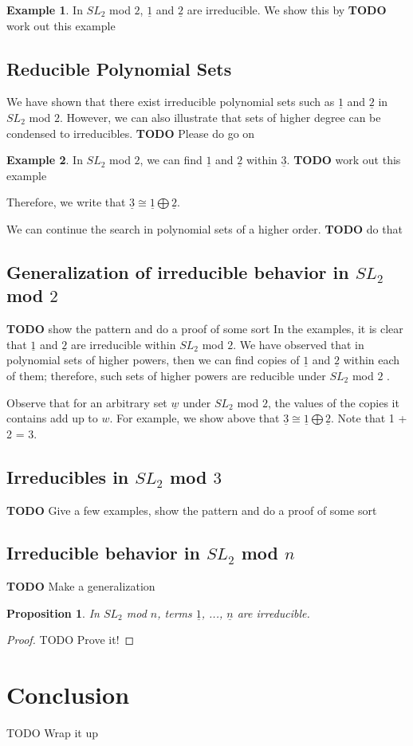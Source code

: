 \documentclass[a4paper,draft]{amsproc}
\theoremstyle{plain}
\newtheorem{prop}{Proposition}[section]
\theoremstyle{definition}
\newtheorem{exm}{Example}[section]
\theoremstyle{remark}
\numberwithin{equation}{section}
\begin{document}
\begin{exm}
In  $SL_{2}$ mod $2$, $\underline{1}$ and $\underline{2}$ are irreducible. We show this by
\textbf{TODO} work out this example
\end{exm}

\subsection{Reducible Polynomial Sets}
We have shown that there exist irreducible polynomial sets such as $\underline{1}$ and $\underline{2}$ in  $SL_{2}$ mod $2$. However, we can also illustrate that sets of higher degree can be condensed to irreducibles. 
\textbf{TODO} Please do go on
\begin{exm}
In  $SL_{2}$ mod $2$, we can find $\underline{1}$ and $\underline{2}$ within $\underline{3}$. 
\textbf{TODO} work out this example

Therefore, we write that $\underline{3} \cong \underline{1} \bigoplus \underline{2}$. 
\end{exm}

We can continue the search in polynomial sets of a higher order. 
\textbf{TODO} do that

\subsection{Generalization of irreducible behavior in $SL_{2}$ mod $2$ }
\textbf{TODO} show the pattern and do a proof of some sort
In the examples, it is clear that $\underline{1}$ and $\underline{2}$ are irreducible within $SL_{2}$ mod $2$. We have observed that in polynomial sets of higher powers, then we can find copies of $\underline{1}$ and $\underline{2}$ within each of them; therefore, such sets of higher powers are reducible under $SL_{2}$ mod $2$ . 

Observe that for an arbitrary set $\underline{w}$ under $SL_{2}$ mod $2$, the values of the copies it contains add up to $w$. For example, we show above that $\underline{3} \cong \underline{1} \bigoplus \underline{2}$. Note that 1 + 2 = 3. 

\subsection{Irreducibles in $SL_{2}$ mod $3$}
\textbf{TODO} Give a few examples, show the pattern and do a proof of some sort

\subsection{Irreducible behavior in $SL_{2}$ mod $n$}
\textbf{TODO} Make a generalization
\begin{prop}
 In $SL_{2}$ mod $n$, terms $\underline{1}$, ..., $\underline{n}$ are irreducible. 
\end{prop}
\begin{proof}
{TODO} Prove it!
\end{proof}

\section{Conclusion}
{TODO} Wrap it up

\end{document}
